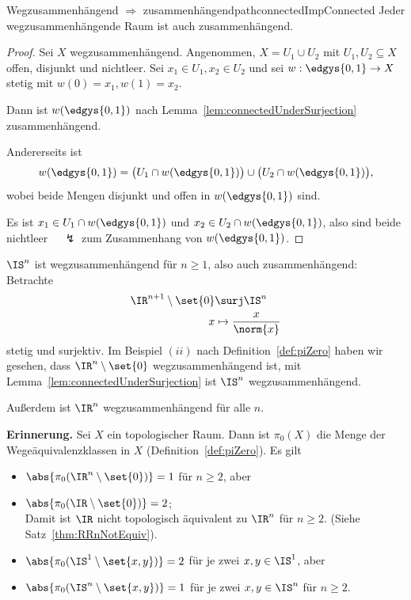 \documentclass[language=ngerman]{TemplateLecture} %
\begin{document}
\begin{thm}{Wegzusammenhängend $\Rightarrow$ zusammenhängend}{pathconnectedImpConnected}
    Jeder wegzusammenhängende Raum ist auch zusammenhängend.
\end{thm}
\begin{proof}
    Sei $X$ wegzusammenhängend. Angenommen, $X = U_1 \cup U_2$ mit $U_1, U_2 \subseteq X$ offen, disjunkt und nichtleer. Sei $x_1 \in U_1, x_2 \in U_2$ und sei $w: \edgys{0,1} \to X$ stetig mit $w(0) = x_1, w(1) = x_2$. 

    Dann ist $w(\edgys{0,1})$ nach Lemma~\ref{lem:connectedUnderSurjection} zusammenhängend. 

    Andererseits ist 
    \begin{equation*}
        w(\edgys{0,1}) = \bigl(U_1 \cap w(\edgys{0,1})\bigr) \cup \bigl(U_2 \cap w(\edgys{0,1})\bigr),
    \end{equation*}
    wobei beide Mengen disjunkt und offen in $w(\edgys{0,1})$ sind. 

    Es ist $x_1 \in U_1 \cap w(\edgys{0,1})$ und $x_2 \in U_2 \cap w(\edgys{0,1})$, also sind beide nichtleer $\quad \lightning$ zum Zusammenhang von $w(\edgys{0,1})$.
\end{proof}

\begin{example}
    $\IS^n$ ist wegzusammenhängend für $n \geq 1$, also auch zusammenhängend: Betrachte 
    \begin{align*}
        \IR^{n+1} \setminus \set{0} &\surj \IS^n \\
        x &\mapsto \frac{x}{\norm{x}}
    \end{align*}
    stetig und surjektiv. Im Beispiel $(ii)$ nach Definition~\ref{def:piZero} haben wir gesehen, dass $\IR^n \setminus \set{0}$ wegzusammenhängend ist, mit Lemma~\ref{lem:connectedUnderSurjection} ist $\IS^n$ wegzusammenhängend. 

    Außerdem ist $\IR^n$ wegzusammenhängend für alle $n$.
\end{example}

\textbf{Erinnerung.} Sei $X$ ein topologischer Raum. Dann ist $\pi_0(X)$ die Menge der Wegeäquivalenzklassen in $X$ (Definition~\ref{def:piZero}). Es gilt 
\begin{itemize}
    \item $\abs{\pi_0(\IR^n \setminus \set{0})} = 1$ für $n \geq 2$, aber 
    \item $\abs{\pi_0(\IR \setminus \set{0})} = 2$; \\ Damit ist $\IR$ nicht topologisch äquivalent zu $\IR^n$ für $n \geq 2$. (Siehe Satz~\ref{thm:RRnNotEquiv}).
    \item $\abs{\pi_0(\IS^1 \setminus \set{x,y})} = 2$ für je zwei $x,y \in \IS^1$, aber 
    \item $\abs{\pi_0(\IS^n \setminus \set{x,y})} = 1$ für je zwei $x,y \in \IS^n$ für $n \geq 2$.
\end{itemize}
\end{document}
